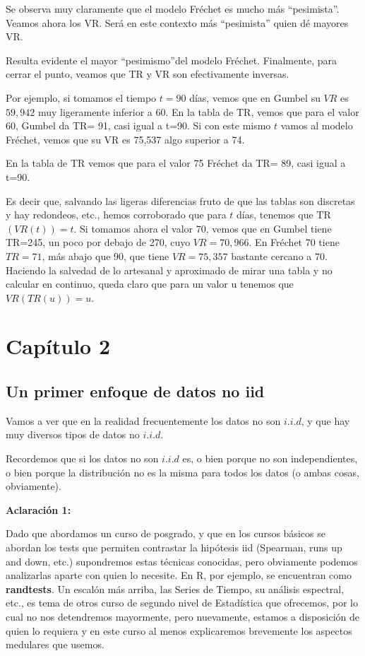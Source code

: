 \documentclass[
  oneside]{book}
\begin{document}
Se observa muy claramente que el modelo Fréchet es mucho más
``pesimista''. Veamos ahora los VR. Será en este contexto más
``pesimista'' quien dé mayores VR.

Resulta evidente el mayor ``pesimismo''del modelo Fréchet. Finalmente,
para cerrar el punto, veamos que TR y VR son efectivamente inversas.

Por ejemplo, si tomamos el tiempo \(t=90\) días, vemos que en Gumbel su
\(VR\) es \(59,942\) muy ligeramente inferior a 60. En la tabla de TR,
vemos que para el valor 60, Gumbel da TR= 91, casi igual a t=90. Si con
este mismo \(t\) vamos al modelo Fréchet, vemos que su VR es 75,537 algo
superior a 74.

En la tabla de TR vemos que para el valor 75 Fréchet da TR= 89, casi
igual a t=90.

Es decir que, salvando las ligeras diferencias fruto de que las tablas
son discretas y hay redondeos, etc., hemos corroborado que para \(t\)
días, tenemos que TR \((VR(t))=t\). Si tomamos ahora el valor 70, vemos
que en Gumbel tiene TR=245, un poco por debajo de 270, cuyo
\(VR=70,966\). En Fréchet 70 tiene \(TR=71\), más abajo que 90, que
tiene \(VR= 75,357\) bastante cercano a 70. Haciendo la salvedad de lo
artesanal y aproximado de mirar una tabla y no calcular en continuo,
queda claro que para un valor u tenemos que \(VR(TR(u))=u\).

\newpage
\chapter{Capítulo 2}
\section{Un primer enfoque de datos no iid}

Vamos a ver que en la realidad frecuentemente los datos no son
\(i.i.d\), y que hay muy diversos tipos de datos no \(i.i.d\).

Recordemos que si los datos no son \(i.i.d\) es, o bien porque no son
independientes, o bien porque la distribución no es la misma para todos
los datos (o ambas cosas, obviamente).

\textbf{Aclaración 1:}

Dado que abordamos un curso de posgrado, y que en los cursos básicos se
abordan los tests que permiten contrastar la hipótesis iid (Spearman,
runs up and down, etc.) supondremos estas técnicas conocidas, pero
obviamente podemos analizarlas aparte con quien lo necesite. En R, por
ejemplo, se encuentran como \textbf{randtests}. Un escalón más arriba,
las Series de Tiempo, su análisis espectral, etc., es tema de otros
curso de segundo nivel de Estadística que ofrecemos, por lo cual no nos
detendremos mayormente, pero nuevamente, estamos a disposición de quien
lo requiera y en este curso al menos explicaremos brevemente los
aspectos medulares que usemos.
\end{document}
